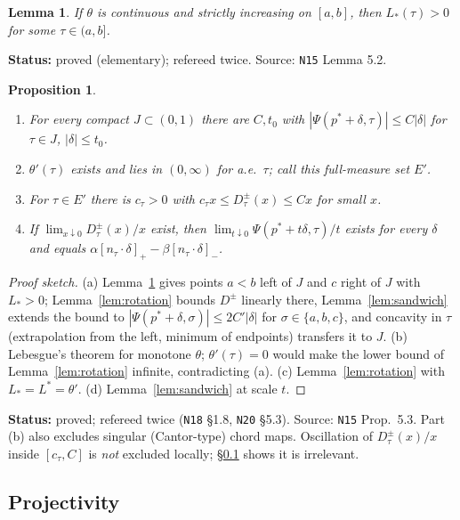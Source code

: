 \documentclass[11pt]{article}
\newtheorem{lemma}[theorem]{Lemma}
\newtheorem{proposition}[theorem]{Proposition}
\theoremstyle{definition}
\theoremstyle{remark}
\newcommand{\src}[1]{\texttt{#1}}
\newcommand{\status}[1]{\par\smallskip\noindent\textbf{Status:} #1\par\smallskip}
\begin{document}
\begin{lemma}\label{lem:risingsun}
If $\theta$ is continuous and strictly increasing on $[a,b]$, then $L_*(\tau)>0$ for some $\tau\in(a,b]$.
\end{lemma}
\status{proved (elementary); refereed twice. Source: \src{N15} Lemma 5.2.}

\begin{proposition}\label{prop:regularity}
\begin{enumerate}[leftmargin=*,label=(\alph*)]
\item For every compact $J\subset(0,1)$ there are $C,t_0$ with $|\Psi(p^*+\delta,\tau)|\le C|\delta|$ for $\tau\in J$, $|\delta|\le t_0$.
\item $\theta'(\tau)$ exists and lies in $(0,\infty)$ for a.e.\ $\tau$; call this full-measure set $E'$.
\item For $\tau\in E'$ there is $c_\tau>0$ with $c_\tau x\le D^\pm_\tau(x)\le Cx$ for small $x$.
\item If $\lim_{x\downarrow0}D^\pm_\tau(x)/x$ exist, then $\lim_{t\downarrow0}\Psi(p^*+t\delta,\tau)/t$ exists for every $\delta$ and equals $\alpha[n_\tau\cdot\delta]_+-\beta[n_\tau\cdot\delta]_-$.
\end{enumerate}
\end{proposition}
\begin{proof}[Proof sketch]
(a) Lemma~\ref{lem:risingsun} gives points $a<b$ left of $J$ and $c$ right of $J$ with $L_*>0$; Lemma~\ref{lem:rotation} bounds $D^\pm$ linearly there, Lemma~\ref{lem:sandwich} extends the bound to $|\Psi(p^*+\delta,\sigma)|\le2C'|\delta|$ for $\sigma\in\{a,b,c\}$, and concavity in $\tau$ (extrapolation from the left, minimum of endpoints) transfers it to $J$. (b) Lebesgue's theorem for monotone $\theta$; $\theta'(\tau)=0$ would make the lower bound of Lemma~\ref{lem:rotation} infinite, contradicting (a). (c) Lemma~\ref{lem:rotation} with $L_*=L^*=\theta'$. (d) Lemma~\ref{lem:sandwich} at scale $t$.
\end{proof}
\status{proved; refereed twice (\src{N18} \S1.8, \src{N20} \S5.3). Source: \src{N15} Prop.~5.3. Part (b) also excludes singular (Cantor-type) chord maps. Oscillation of $D^\pm_\tau(x)/x$ inside $[c_\tau,C]$ is \emph{not} excluded locally; \S\ref{sec:proj} shows it is irrelevant.}

\subsection{Projectivity}\label{sec:proj}
\end{document}
